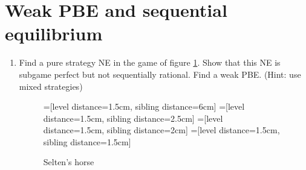 \documentclass[a4paper,12pt]{article}
\begin{document}
\section{Weak PBE and sequential equilibrium}
\label{sec:weak-pbe-sequential}

\begin{enumerate}
\item Find a pure strategy NE in the game of figure \ref{fig:selten_ex}. Show that this NE is subgame perfect but not sequentially rational. Find a weak PBE. (Hint: use mixed strategies)
   \begin{figure}[h]
\centering
=[level distance=1.5cm, sibling distance=6cm]
=[level distance=1.5cm, sibling distance=2.5cm]
=[level distance=1.5cm, sibling distance=2cm]
=[level distance=1.5cm, sibling distance=1.5cm]
\caption{Selten's horse}
\label{fig:selten_ex}
\end{figure}


\end{enumerate}
\end{document}
